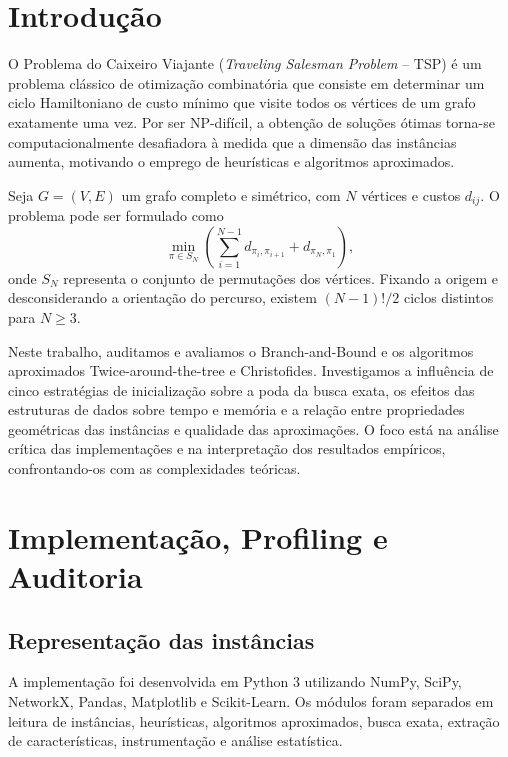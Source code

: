 \section{Introdução}

O Problema do Caixeiro Viajante (\textit{Traveling Salesman Problem} -- TSP) é um problema clássico de otimização combinatória que consiste em determinar um ciclo Hamiltoniano de custo mínimo que visite todos os vértices de um grafo exatamente uma vez. Por ser NP-difícil, a obtenção de soluções ótimas torna-se computacionalmente desafiadora à medida que a dimensão das instâncias aumenta, motivando o emprego de heurísticas e algoritmos aproximados.

Seja $G=(V,E)$ um grafo completo e simétrico, com $N$ vértices e custos $d_{ij}$. O problema pode ser formulado como
\begin{equation}
\min_{\pi\in S_N}\left(\sum_{i=1}^{N-1}d_{\pi_i,\pi_{i+1}}+d_{\pi_N,\pi_1}\right),
\end{equation}
onde $S_N$ representa o conjunto de permutações dos vértices. Fixando a origem e desconsiderando a orientação do percurso, existem $(N-1)!/2$ ciclos distintos para $N\geq3$.

Neste trabalho, auditamos e avaliamos o Branch-and-Bound e os algoritmos aproximados Twice-around-the-tree e Christofides. Investigamos a influência de cinco estratégias de inicialização sobre a poda da busca exata, os efeitos das estruturas de dados sobre tempo e memória e a relação entre propriedades geométricas das instâncias e qualidade das aproximações. O foco está na análise crítica das implementações e na interpretação dos resultados empíricos, confrontando-os com as complexidades teóricas.

\section{Implementação, Profiling e Auditoria}

\subsection{Representação das instâncias}

A implementação foi desenvolvida em Python 3 utilizando NumPy, SciPy, NetworkX, Pandas, Matplotlib e Scikit-Learn. Os módulos foram separados em leitura de instâncias, heurísticas, algoritmos aproximados, busca exata, extração de características, instrumentação e análise estatística.

